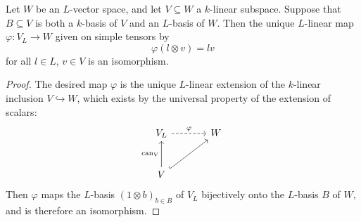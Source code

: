 \begin{corollary}
\label{corollary: inclusion to bijection vector spaces}
  Let $W$ be an $L$-vector space, and let $V \subseteq W$ a $k$-linear subspace.
  Suppose that $B \subseteq V$ is both a $k$-basis of $V$ and an $L$-basis of $W$.
  Then the unique $L$-linear map $\varphi \colon V_L \to W$ given on simple tensors by
  \[
      \varphi(l \otimes v)
    = l v
  \]
  for all $l \in L$, $v \in V$ is an isomorphism.
\end{corollary}


\begin{proof}
  The desired map $\varphi$ is the unique $L$-linear extension of the $k$-linear inclusion $V \hookrightarrow W$, which exists by the universal property of the extension of scalars:
  \[
    \begin{tikzcd}[sep = large]
        V_L
        \arrow[dashed]{r}[above]{\varphi}
      & W
      \\
        V
        \arrow{u}[left]{\can_V}
        \arrow[hookrightarrow]{ru}
      & {}
    \end{tikzcd}
  \]
  Then $\varphi$ maps the $L$-basis $(1 \otimes b)_{b \in B}$ of $V_L$ bijectively onto the $L$-basis $B$ of $W$, and is therefore an isomorphism.
\end{proof}



